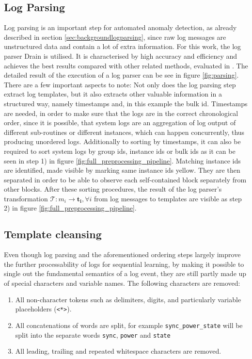 \subsection{Log Parsing}\label{sec:conceptlogparsing}
Log parsing is an important step for automated anomaly detection, as already described in section \ref{sec:backgroundlogparsing}, since raw log messages are unstructured data and contain a lot of extra information. 
For this work, the log parser Drain \cite{he2017drain} is utilised. It is characterised by high accuracy and efficiency \cite{he2017drain} and achieves the best results compared with other related methods, evaluated in \cite{zhu2019tools}. The detailed result of the execution of a log parser can be see in figure \ref{fig:parsing}. 
There are a few important aspects to note: Not only does the log parsing step extract log templates, but it also extracts other valuable information in a structured way, namely timestamps and, in this example the bulk id. Timestamps are needed, in order to make sure that the logs are in the correct chronological order, since it is possible, that system logs are an aggregation of log output of different sub-routines or different instances, which can happen concurrently, thus producing unordered logs. Additionally to sorting by timestamps, it can also be required to sort system logs by group ids, instance ids or bulk ids as it can be seen in step 1) in figure \ref{fig:full_preprocessing_pipeline}. Matching instance ids are identified, made visible by marking same instance ids yellow. They are then separated in order to be able to observe each self-contained block separately from other blocks. After these sorting procedures, the result of the log parser's transformation $\mathcal{T}: m_i \to \mathbf{t_i}, \forall i$ from log messages to templates are visible as step 2) in figure \ref{fig:full_preprocessing_pipeline}.

\subsection{Template cleansing \label{sec:template_cleansing}}
Even though log parsing and the aforementioned ordering steps largely improve the further processability of logs for sequential learning, by making it possible to single out the fundamental semantics of a log event, they are still partly made up of special characters and variable names. The following characters are removed:
\begin{enumerate}
	\item All non-character tokens such as delimiters, digits, and particularly variable placeholders (\verb!<*>!).
	\item All concatenations of words are split, for example \verb!sync_power_state! will be split into the separate words \verb!sync!, \verb!power! and \verb!state!
	\item All leading, trailing and repeated whitespace characters are removed.
\end{enumerate}

